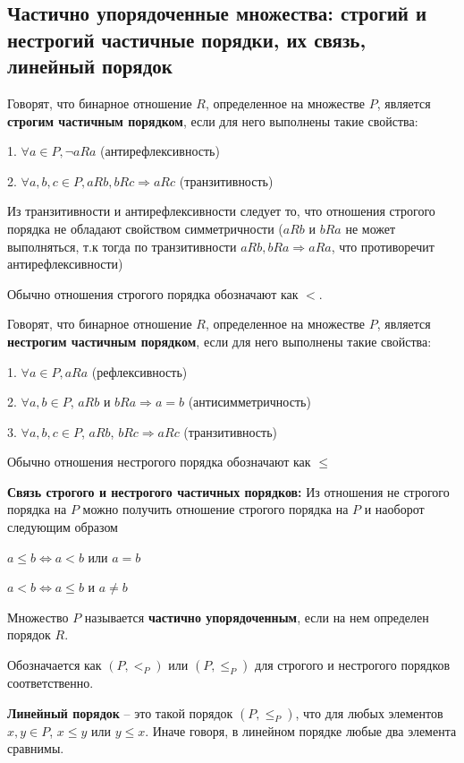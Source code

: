 \subsection{Частично упорядоченные множества: строгий и нестрогий частичные порядки, их связь, линейный порядок}

Говорят, что бинарное отношение $R$, определенное на множестве $P$, является \textbf{строгим частичным порядком}, если для него выполнены такие свойства:

\hspace{0.5cm}\parbox{12cm} {
    1. $\forall a \in P, \neg aRa$ (антирефлексивность)

    2. $\forall a, b, c \in P, aRb, bRc \Rightarrow aRc$ (транзитивность)
}

Из транзитивности и антирефлексивности следует то, что отношения строгого порядка не обладают свойством симметричности ($aRb$ и $bRa$ не может выполняться, т.к тогда по транзитивности $aRb, bRa \Rightarrow aRa$, что противоречит антирефлексивности)

Обычно отношения строгого порядка обозначают как $<$.

Говорят, что бинарное отношение $R$, определенное на множестве $P$, является \textbf{нестрогим частичным порядком}, если для него выполнены такие свойства:

\hspace{0.5cm}\parbox{12cm} {
    1. $\forall a \in P, aRa$ (рефлексивность)

    2. $\forall a, b \in P$, $aRb$ и $bRa \Rightarrow a = b$ (антисимметричность)

    3. $\forall a, b, c \in P$, $aRb$, $bRc \Rightarrow aRc$ (транзитивность)
}

Обычно отношения нестрогого порядка обозначают как $\le$

\textbf{Связь строгого и нестрогого частичных порядков:} Из отношения не строгого порядка на $P$ можно получить отношение строгого порядка на $P$ и наоборот следующим образом

\begin{center}
    $a \le b \Leftrightarrow a < b$ или $a = b$

    $a < b \Leftrightarrow a \le b$ и $a \neq b$
\end{center}

Множество $P$ называется \textbf{частично упорядоченным}, если на нем определен порядок $R$.

Обозначается как $(P, <_P)$ или $(P, \le_P)$ для строгого и нестрогого порядков соответственно.

\textbf{Линейный порядок} -- это такой порядок $(P, \le_P)$, что для любых элементов $x, y \in P$, $x \le y$ или $y \le x$. Иначе говоря, в линейном порядке любые два элемента сравнимы.
